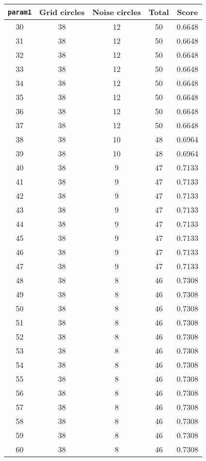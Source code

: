 \documentclass[letterpaper, 12pt]{article}
\begin{document}
\begin{longtable}{|c|c|c|c|c|}
\hline
\textbf{\texttt{param1}} & \textbf{Grid circles} & \textbf{Noise circles} & \textbf{Total} & \textbf{Score} \\
\hline
30 & 38 & 12 & 50 & 0.6648 \\
\hline
31 & 38 & 12 & 50 & 0.6648 \\
\hline
32 & 38 & 12 & 50 & 0.6648 \\
\hline
33 & 38 & 12 & 50 & 0.6648 \\
\hline
34 & 38 & 12 & 50 & 0.6648 \\
\hline
35 & 38 & 12 & 50 & 0.6648 \\
\hline
36 & 38 & 12 & 50 & 0.6648 \\
\hline
37 & 38 & 12 & 50 & 0.6648 \\
\hline
38 & 38 & 10 & 48 & 0.6964 \\
\hline
39 & 38 & 10 & 48 & 0.6964 \\
\hline
40 & 38 & 9 & 47 & 0.7133 \\
\hline
41 & 38 & 9 & 47 & 0.7133 \\
\hline
42 & 38 & 9 & 47 & 0.7133 \\
\hline
43 & 38 & 9 & 47 & 0.7133 \\
\hline
44 & 38 & 9 & 47 & 0.7133 \\
\hline
45 & 38 & 9 & 47 & 0.7133 \\
\hline
46 & 38 & 9 & 47 & 0.7133 \\
\hline
47 & 38 & 9 & 47 & 0.7133 \\
\hline
48 & 38 & 8 & 46 & 0.7308 \\
\hline
49 & 38 & 8 & 46 & 0.7308 \\
\hline
50 & 38 & 8 & 46 & 0.7308 \\
\hline
51 & 38 & 8 & 46 & 0.7308 \\
\hline
52 & 38 & 8 & 46 & 0.7308 \\
\hline
53 & 38 & 8 & 46 & 0.7308 \\
\hline
54 & 38 & 8 & 46 & 0.7308 \\
\hline
55 & 38 & 8 & 46 & 0.7308 \\
\hline
56 & 38 & 8 & 46 & 0.7308 \\
\hline
57 & 38 & 8 & 46 & 0.7308 \\
\hline
58 & 38 & 8 & 46 & 0.7308 \\
\hline
59 & 38 & 8 & 46 & 0.7308 \\
\hline
60 & 38 & 8 & 46 & 0.7308 \\
\hline

\end{longtable}
\end{document}

